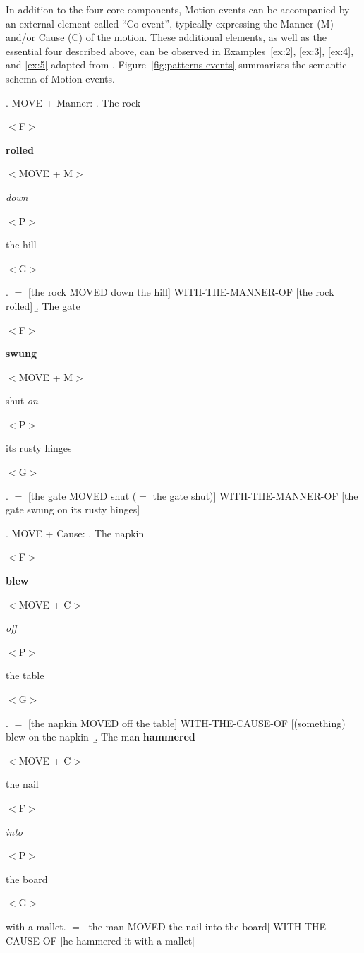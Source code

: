 In addition to the four core components, Motion events can be accompanied by an external element called ``Co-event'', typically expressing the Manner (M) and/or Cause (C) of the motion. These additional elements, as well as the essential four described above, can be observed in Examples~\ref{ex:2}, \ref{ex:3}, \ref{ex:4}, and \ref{ex:5} adapted from \textcite{talmy2000towardb}. 
Figure~\ref{fig:patterns-events} summarizes the semantic schema of Motion events.

\footnotesize{
\ex. MOVE + Manner: \label{ex:2}
    \a. The rock\begin{scriptsize}$<$F$>$\end{scriptsize} \textbf{rolled}\begin{scriptsize}$<$MOVE + M$>$\end{scriptsize} \textit{down}\begin{scriptsize}$<$P$>$\end{scriptsize} the hill\begin{scriptsize}$<$G$>$\end{scriptsize}. $=$ 
    [the rock MOVED down the hill] WITH-THE-MANNER-OF [the rock rolled] 
    \b. The gate\begin{scriptsize}$<$F$>$\end{scriptsize} \textbf{swung}\begin{scriptsize}$<$MOVE + M$>$\end{scriptsize} shut \textit{on}\begin{scriptsize}$<$P$>$\end{scriptsize} its rusty hinges\begin{scriptsize}$<$G$>$\end{scriptsize}. $=$ [the gate MOVED shut ($=$ the gate shut)] WITH-THE-MANNER-OF [the gate swung on its rusty hinges] 

\ex. MOVE + Cause: \label{ex:3}
    \a. The napkin\begin{scriptsize}$<$F$>$\end{scriptsize} \textbf{blew}\begin{scriptsize}$<$MOVE + C$>$\end{scriptsize} \textit{off}\begin{scriptsize}$<$P$>$\end{scriptsize} the table\begin{scriptsize}$<$G$>$\end{scriptsize}. $=$ 
    [the napkin MOVED off the table] WITH-THE-CAUSE-OF [(something) blew on the napkin] 
    \b. The man \textbf{hammered}\begin{scriptsize}$<$MOVE + C$>$\end{scriptsize} the nail\begin{scriptsize}$<$F$>$\end{scriptsize}  \textit{into}\begin{scriptsize}$<$P$>$\end{scriptsize} the board\begin{scriptsize}$<$G$>$\end{scriptsize} with a mallet. $=$ [the man MOVED the nail into the board] WITH-THE-CAUSE-OF [he hammered it with a mallet] 
    
}
